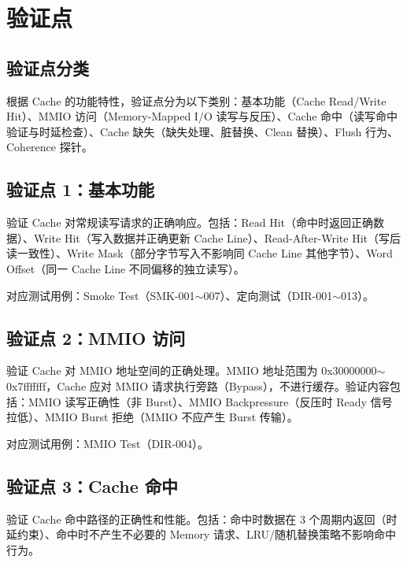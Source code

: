 \documentclass[12pt,a4paper]{ctexart}
\begin{document}
\newpage

\section{验证点}

\subsection{验证点分类}

根据 Cache 的功能特性，验证点分为以下类别：基本功能（Cache Read/Write Hit）、MMIO 访问（Memory-Mapped I/O 读写与反压）、Cache 命中（读写命中验证与时延检查）、Cache 缺失（缺失处理、脏替换、Clean 替换）、Flush 行为、Coherence 探针。

\subsection{验证点 1：基本功能}

验证 Cache 对常规读写请求的正确响应。包括：Read Hit（命中时返回正确数据）、Write Hit（写入数据并正确更新 Cache Line）、Read-After-Write Hit（写后读一致性）、Write Mask（部分字节写入不影响同 Cache Line 其他字节）、Word Offset（同一 Cache Line 不同偏移的独立读写）。

对应测试用例：Smoke Test（SMK-001$\sim$007）、定向测试（DIR-001$\sim$013）。

\subsection{验证点 2：MMIO 访问}

验证 Cache 对 MMIO 地址空间的正确处理。MMIO 地址范围为 0x30000000$\sim$0x7fffffff，Cache 应对 MMIO 请求执行旁路（Bypass），不进行缓存。验证内容包括：MMIO 读写正确性（非 Burst）、MMIO Backpressure（反压时 Ready 信号拉低）、MMIO Burst 拒绝（MMIO 不应产生 Burst 传输）。

对应测试用例：MMIO Test（DIR-004）。

\subsection{验证点 3：Cache 命中}

验证 Cache 命中路径的正确性和性能。包括：命中时数据在 3 个周期内返回（时延约束）、命中时不产生不必要的 Memory 请求、LRU/随机替换策略不影响命中行为。
\end{document}
